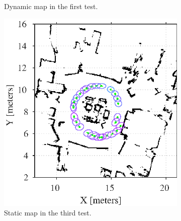 \begin{figure}[htbp]
\begin{subfigure}[t]{0.45\linewidth}
       	\caption{Dynamic map in the first test.}
       	\label{fig:amcl_covariance_dynamic1}
    \end{subfigure}
   	\begin{subfigure}[t]{0.45\linewidth}
        \includegraphics[width=1\linewidth]{chapters/evaluation/figures/localization_static_map3}	
        \caption{Static map in the third test.}
        \label{fig:amcl_covariance_static3}
    \end{subfigure}
    \hspace{2mm}
   	\begin{subfigure}[t]{0.45\linewidth}

\end{subfigure}
\end{figure}
